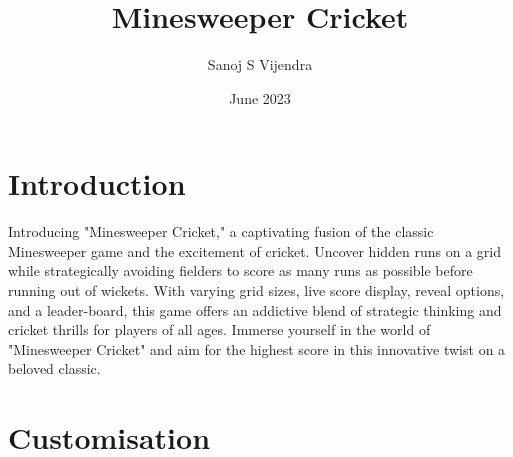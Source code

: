 \documentclass{article}
\title{Minesweeper Cricket}
\author{Sanoj S Vijendra}
\date{June 2023}
\begin{document}
\maketitle

\tableofcontents
\clearpage

\section{Introduction}
Introducing "Minesweeper Cricket," a captivating fusion of the classic Minesweeper game and the excitement of cricket. Uncover hidden runs on a grid while strategically avoiding fielders to score as many runs as possible before running out of wickets. With varying grid sizes, live score display, reveal options, and a leader-board, this game offers an addictive blend of strategic thinking and cricket thrills for players of all ages. Immerse yourself in the world of "Minesweeper Cricket" and aim for the highest score in this innovative twist on a beloved classic.
\section{Customisation}
\end{document}
